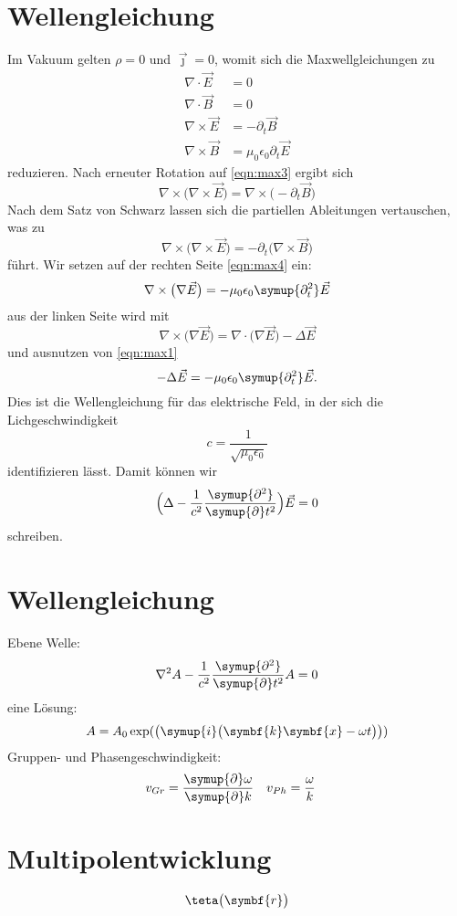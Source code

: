 \documentclass {scrartcl}
\newcommand{\be}{\begin{equation}} %
\newcommand{\ee}{\end{equation}} %
\begin{document}
\section{Wellengleichung}
Im Vakuum gelten $\rho=0$ und $\vec{\jmath}=0$, womit sich die Maxwellgleichungen
zu
\begin{align}
  \nabla\cdot\vec{E}&=0 \label{eqn:max1} \\
  \nabla\cdot\vec{B}&=0 \label{eqn:max2} \\
  \nabla\times\vec{E}&=-\partial_t\vec{B} \label{eqn:max3} \\
  \nabla\times\vec{B}&=\mu_0\epsilon_0\partial_t\vec{E} \label{eqn:max4}
\end{align}
reduzieren. Nach erneuter Rotation auf \eqref{eqn:max3} ergibt sich
\be
\nabla\times\bigl(\nabla\times\vec{E}\bigr)=\nabla\times\bigl(-\partial_t\vec{B}\bigr)
\label{eqn:rot}
\ee
Nach dem Satz von Schwarz lassen sich die partiellen Ableitungen vertauschen, was zu
\be
\nabla\times\bigl(\nabla\times\vec{E}\bigr)=-\partial_t\bigl(\nabla\times\vec{B}\bigr)
\label{eqn:schwarz}
\ee
führt. Wir setzen auf der rechten Seite \eqref{eqn:max4} ein:
\be
\nabla\times\bigl(\nabla\vec{E}\bigr)=-\mu_0\epsilon_0\symup{\partial_t^2}\vec{E}\label{eqn:ein}
\ee
aus der linken Seite wird mit
\be
\nabla\times\bigl(\nabla\vec{E}\bigr)=\nabla\cdot\bigl(\nabla\vec{E}\bigr)-\Delta
\vec{E} \label{eqn:2}
\ee
\newpage
und ausnutzen von \eqref{eqn:max1}
\be
-\Delta\vec{E}=-\mu_0\epsilon_0\symup{\partial_t^2}\vec{E}.
\label{eqn:13}
\ee
Dies ist die Wellengleichung für das elektrische Feld,
in der sich die Lichgeschwindigkeit
\be
c=\frac{1}{\sqrt{\mu_0\epsilon_0}}\label{eqn:14}
\ee
identifizieren lässt. Damit können wir
\be
\Bigl(\Delta-\frac{1}{c^2}\frac{\symup{\partial^2}}{\symup{\partial}t^2}\Bigr)
\vec{E}=0 \label{eqn:15}
\ee
schreiben.
\section{Wellengleichung}
Ebene Welle:
\be
\nabla^2 A -\frac{1}{c^2}\frac{\symup{\partial^2}}{\symup{\partial}t^2}A=0
\label{eqn:16}
\ee
eine Lösung:
\be
A=A_0\exp(\bigl(\symup{i}\bigl(\symbf{k} \symbf{x}-\omega t\bigr)\bigr)) \label{eqn:17}
\ee
Gruppen- und Phasengeschwindigkeit:
\begin{align}
  v_{Gr}&=\frac{\symup{\partial}\omega}{\symup{\partial}k} &
  v_{Ph}&=\frac{\omega}{k}
\end{align}
\section{Multipolentwicklung}
\be
\teta\bigl(\symbf{r}\bigr)
\ee
\end{document}
